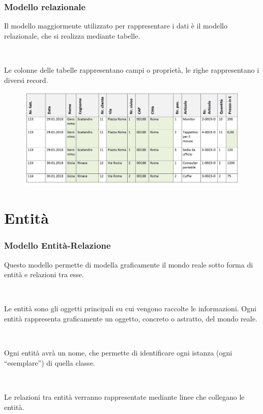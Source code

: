 \documentclass[]{beamer}
\begin{document}
\begin{frame}
\frametitle{Modello relazionale}
Il modello maggiormente utilizzato per rappresentare i dati è il \alert<1>{modello relazionale}, che si realizza mediante tabelle.\pause

~

Le colonne delle tabelle rappresentano campi o proprietà, le righe rappresentano i diversi record.

\begin{figure}
  \includegraphics[width=.9\columnwidth]{img/tabelladb.jpg}
\end{figure}
\end{frame}

\section{Entità}

\begin{frame}
\frametitle{Modello Entità-Relazione}
Questo modello permette di modella graficamente il mondo reale sotto forma di \alert<1>{entità} e \alert<1>{relazioni} tra esse.\pause

~

Le entità sono gli oggetti principali su cui vengono raccolte le informazioni. Ogni entità rappresenta graficamente un oggetto, concreto o astratto, del mondo reale.\pause

~

Ogni entità avrà un nome, che permette di identificare ogni \alert<3>{istanza} (ogni ``esemplare'') di quella classe.\pause

~

Le relazioni tra entità verranno rappresentate mediante linee che collegano le entità.
\end{frame}
\end{document}
